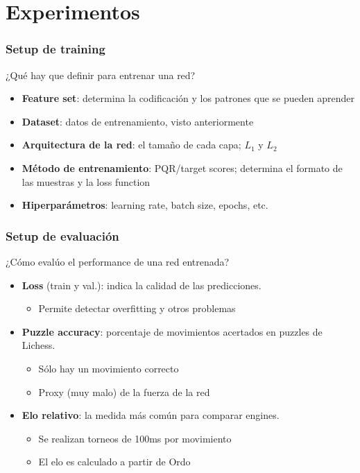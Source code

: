 
\section{Experimentos}

\begin{frame}
\frametitle{Setup de training}
¿Qué hay que definir para entrenar una red? \pause
\begin{itemize}
\item \textbf{Feature set}: determina la codificación y los patrones que se pueden aprender \pause
\item \textbf{Dataset}: datos de entrenamiento, visto anteriormente \pause
\item \textbf{Arquitectura de la red}: el tamaño de cada capa; $L_1$ y $L_2$ \pause
\item \textbf{Método de entrenamiento}: PQR/target scores; determina el formato de las muestras y la loss function  \pause
\item \textbf{Hiperparámetros}: learning rate, batch size, epochs, etc.
\end{itemize}
\end{frame}

\begin{frame}
\frametitle{Setup de evaluación}
¿Cómo evalúo el performance de una red entrenada? \pause
\begin{itemize}
\item \textbf{Loss} (train y val.): indica la calidad de las predicciones.
\begin{itemize}
    \item Permite detectar overfitting y otros problemas \pause
\end{itemize}
\item \textbf{Puzzle accuracy}: porcentaje de movimientos acertados en puzzles de Lichess.
\begin{itemize}
    \item Sólo hay un movimiento correcto
    \item Proxy (muy malo) de la fuerza de la red \pause
\end{itemize}
\item \textbf{Elo relativo}: la medida más común para comparar engines.
\begin{itemize}
    \item Se realizan torneos de 100ms por movimiento
    \item El elo es calculado a partir de Ordo
\end{itemize}
\end{itemize}
\end{frame}


